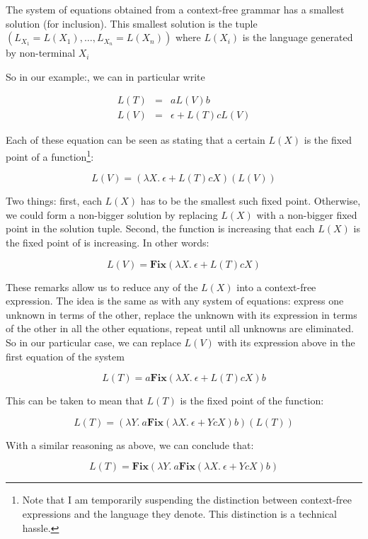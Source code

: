 \begin{prop}\label{prop:sys_eqn}
The system of equations obtained from a context-free grammar has a smallest solution (for inclusion). This smallest solution is the tuple $(L_{X_1} = L(X_1),\ldots, L_{X_n}= L(X_n))$ where $L(X_i)$ is the language generated by non-terminal $X_i$ 
\end{prop}
%
So in our example:, we can in particular write

$$
\begin{array}{lcl}
L(T) &=& aL(V)b\\
L(V) &=& \epsilon + L(T) c L(V)
\end{array}
$$

Each of these equation can be seen as stating that a certain $L(X)$ is the fixed point of a function\footnote{Note that I am temporarily suspending the distinction between context-free expressions and the language they denote. This distinction is a technical hassle.}:

$$L(V) = \left( 	\lambda X.\ \epsilon + L(T)cX\right)\left( L(V)\right)$$

Two things: first, each $L(X)$ has to be the smallest such fixed point. Otherwise, we could form a non-bigger solution by replacing $L(X)$ with a non-bigger fixed point in the solution tuple. Second, the function is increasing that each $L(X)$ is the fixed point of is increasing. In other words:

$$L(V) = \mathbf{Fix}\left( \lambda X.\ \epsilon + L(T)cX\right)$$

These remarks allow us to reduce any of the $L(X)$ into a context-free expression. The idea is the same as with any system of equations: express one unknown in terms of the other, replace the unknown with its expression in terms of the other in all the other equations, repeat until all unknowns are eliminated. So in our particular case, we can replace $L(V)$ with its expression above in the first equation of the system

$$L(T) = a\mathbf{Fix}\left( \lambda X.\ \epsilon + L(T)cX\right)b$$

This can be taken to mean that $L(T)$ is the fixed point of the function:

$$L(T) = \left(\lambda Y.\ a\mathbf{Fix}\left( \lambda X.\ \epsilon + YcX\right)b\right)\left(L(T)\right)$$

With a similar reasoning as above, we can conclude that:

$$L(T) = \mathbf{Fix}\left(\lambda Y.\ a\mathbf{Fix}\left( \lambda X.\ \epsilon + YcX\right)b\right)$$

